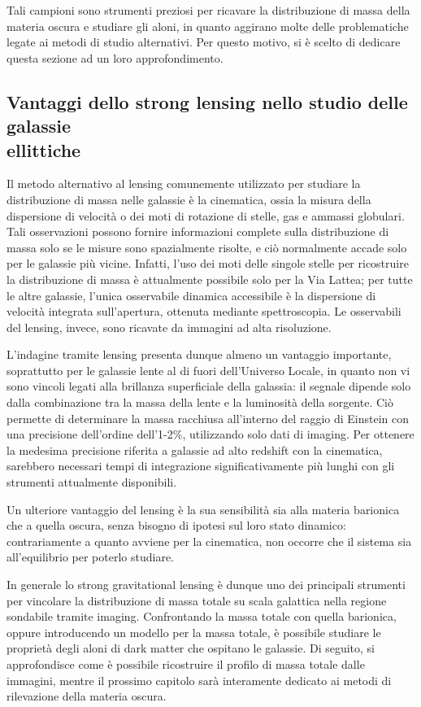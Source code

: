 Tali campioni sono strumenti preziosi per ricavare la distribuzione di massa della materia oscura e studiare gli aloni, in quanto aggirano molte delle problematiche legate ai metodi di studio alternativi. Per questo motivo, si è scelto di dedicare questa sezione ad un loro approfondimento. 
\newpage
\subsection[Vantaggi dello strong lensing nello studio delle galassie ellittiche]{Vantaggi dello strong lensing nello studio delle galassie \\ ellittiche}
Il metodo alternativo al lensing comunemente utilizzato per studiare la distribuzione di massa nelle galassie è la cinematica, ossia la misura della dispersione di velocità o dei moti di rotazione di stelle, gas e ammassi globulari. Tali osservazioni possono fornire informazioni complete sulla distribuzione di massa solo se le misure sono spazialmente risolte, e ciò normalmente accade solo per le galassie più vicine. Infatti, l'uso dei moti delle singole stelle per ricostruire la distribuzione di massa è attualmente possibile solo per la Via Lattea; per tutte le altre galassie, l'unica osservabile dinamica accessibile è la dispersione di velocità integrata sull'apertura, ottenuta mediante spettroscopia. Le osservabili del lensing, invece, sono ricavate da immagini ad alta risoluzione. 

L'indagine tramite lensing presenta dunque almeno un vantaggio importante, soprattutto per le galassie lente al di fuori dell'Universo Locale, in quanto non vi sono vincoli legati alla brillanza superficiale della galassia: il segnale dipende solo dalla combinazione tra la massa della lente e la luminosità della sorgente. 
Ciò permette di determinare la massa racchiusa all'interno del raggio di Einstein con una precisione dell'ordine dell'1-2\%, utilizzando solo dati di imaging. Per ottenere la medesima precisione riferita a galassie ad alto redshift con la cinematica, sarebbero necessari tempi di integrazione significativamente più lunghi con gli strumenti attualmente disponibili.



Un ulteriore vantaggio del lensing è la sua sensibilità sia alla materia barionica che a quella oscura, senza bisogno di ipotesi sul loro stato dinamico: contrariamente a quanto avviene per la cinematica, non occorre che il sistema sia all'equilibrio per poterlo studiare. 

In generale lo strong gravitational lensing è dunque uno dei principali strumenti per vincolare la distribuzione di massa totale su scala galattica nella regione sondabile tramite imaging. Confrontando la massa totale con quella barionica, oppure introducendo un modello per la massa totale, è possibile studiare le proprietà degli aloni di dark matter che ospitano le galassie. Di seguito, si approfondisce come è possibile ricostruire il profilo di massa totale dalle immagini, mentre il prossimo capitolo sarà interamente dedicato ai metodi di rilevazione della materia oscura. 

